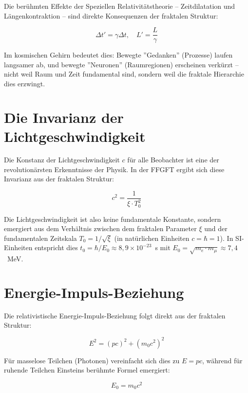 Die berühmten Effekte der Speziellen Relativitätstheorie -- Zeitdilatation und Längenkontraktion -- sind direkte Konsequenzen der fraktalen Struktur:

\begin{equation}
\Delta t' = \gamma \Delta t, \quad L' = \frac{L}{\gamma}
\end{equation}

Im kosmischen Gehirn bedeutet dies: Bewegte ''Gedanken'' (Prozesse) laufen langsamer ab, und bewegte ''Neuronen'' (Raumregionen) erscheinen verkürzt -- nicht weil Raum und Zeit fundamental sind, sondern weil die fraktale Hierarchie dies erzwingt.

\section{Die Invarianz der Lichtgeschwindigkeit}

Die Konstanz der Lichtgeschwindigkeit $c$ für alle Beobachter ist eine der revolutionärsten Erkenntnisse der Physik. In der FFGFT ergibt sich diese Invarianz aus der fraktalen Struktur:

\begin{equation}
c^2 = \frac{1}{\xi \cdot T_0^2}
\end{equation}

Die Lichtgeschwindigkeit ist also keine fundamentale Konstante, sondern emergiert aus dem Verhältnis zwischen dem fraktalen Parameter $\xi$ und der fundamentalen Zeitskala $T_0 = 1/\sqrt{\xi}$ (in natürlichen Einheiten $c = \hbar = 1$). In SI-Einheiten entspricht dies $t_0 = \hbar/E_0 \approx 8{,}9 \times 10^{-23}$~s mit $E_0 = \sqrt{m_e \cdot m_\mu} \approx 7{,}4$~MeV.

\section{Energie-Impuls-Beziehung}

Die relativistische Energie-Impuls-Beziehung folgt direkt aus der fraktalen Struktur:

\begin{equation}
E^2 = (pc)^2 + (m_0c^2)^2
\end{equation}

Für masselose Teilchen (Photonen) vereinfacht sich dies zu $E = pc$, während für ruhende Teilchen Einsteins berühmte Formel emergiert:

\begin{equation}
E_0 = m_0c^2
\end{equation}

